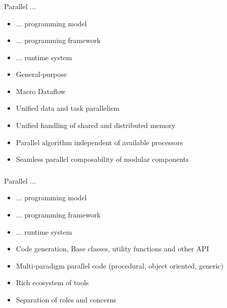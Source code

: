 \begin{frame}[t]
\frametitle{\charm}
\framesubtitle{}
	\begin{block}{Parallel ...}
		\begin{itemize}[<+->]
		\item \alert<4->{... programming model}
		\item ... programming framework
		\item ... runtime system
	\end{itemize}
	\end{block}
    \begin{itemize}[<+->]
        \item General-purpose
        \item Macro Dataflow
        \item Unified data and task parallelism
        \item Unified handling of shared and distributed memory
        \item Parallel algorithm independent of available processors
        \item Seamless parallel composability of modular components
    \end{itemize}
\end{frame}


\begin{frame}[t]
\frametitle{\charm}
\framesubtitle{}
	\begin{block}{Parallel ...}
		\begin{itemize}
		\item ... programming model
		\item \alert{... programming framework}
		\item ... runtime system
	\end{itemize}
	\end{block}
    \begin{itemize}[<+->]
        \item Code generation, Base classes, utility functions and other API
        \item Multi-paradigm parallel code (procedural, object oriented, generic)
        \item Rich ecosystem of tools
        \item Separation of roles and concerns
    \end{itemize}
\end{frame}


